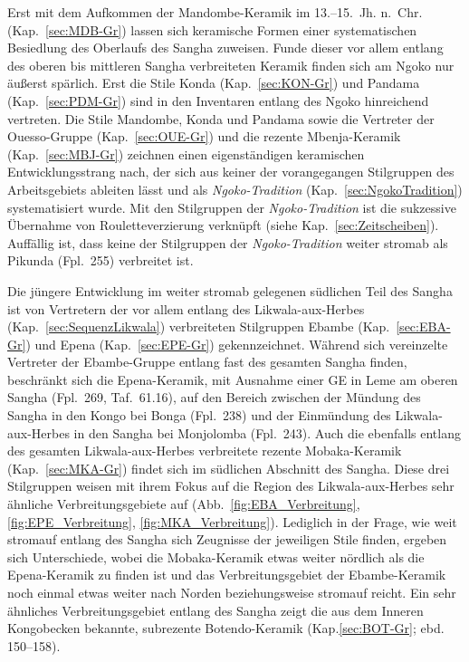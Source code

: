 Erst mit dem Aufkommen der Mandombe-Keramik im 13.--15.~Jh. n.~Chr. (Kap.~\ref{sec:MDB-Gr}) lassen sich keramische Formen einer systematischen Besiedlung des Oberlaufs des \mbox{Sangha} zuweisen. Funde dieser vor allem entlang des oberen bis mittleren \mbox{Sangha} verbreiteten Keramik finden sich am \mbox{Ngoko} nur äußerst spärlich. Erst die Stile Konda (Kap.~\ref{sec:KON-Gr}) und Pandama (Kap.~\ref{sec:PDM-Gr}) sind in den Inventaren entlang des \mbox{Ngoko} hinreichend vertreten. Die Stile Mandombe, Konda und Pandama sowie die Vertreter der Ouesso-Gruppe (Kap.~\ref{sec:OUE-Gr}) und die rezente Mbenja-Keramik (Kap.~\ref{sec:MBJ-Gr}) zeichnen einen eigenständigen keramischen Entwicklungsstrang nach, der sich aus keiner der vorangegangen Stilgruppen des Arbeitsgebiets ableiten lässt und als \textit{\mbox{Ngoko}-Tradition} (Kap.~\ref{sec:NgokoTradition}) systematisiert wurde. Mit den Stilgruppen der \textit{\mbox{Ngoko}-Tradition} ist die sukzessive Übernahme von Rouletteverzierung verknüpft (siehe Kap.~\ref{sec:Zeitscheiben}). Auffällig ist, dass keine der Stilgruppen der \textit{\mbox{Ngoko}-Tradition} weiter stromab als Pikunda (Fpl.~255) verbreitet ist.

Die jüngere Entwicklung im weiter stromab gelegenen südlichen Teil des \mbox{Sangha} ist von Vertretern der vor allem entlang des Likwala-aux-Herbes (Kap.~\ref{sec:SequenzLikwala}) verbreiteten Stilgruppen Ebambe (Kap.~\ref{sec:EBA-Gr}) und Epena (Kap.~\ref{sec:EPE-Gr}) gekennzeichnet. Während sich vereinzelte Vertreter der Ebambe-Gruppe entlang fast des gesamten \mbox{Sangha} finden, beschränkt sich die Epena-Keramik, mit Ausnahme einer GE in Leme am oberen \mbox{Sangha} (Fpl.~269, Taf.~61.16), auf den Bereich zwischen der Mündung des \mbox{Sangha} in den Kongo bei Bonga (Fpl.~238) und der Einmündung des \mbox{Likwala}-\mbox{aux}-\mbox{Herbes} in den \mbox{Sangha} bei Monjolomba (Fpl.~243). Auch die ebenfalls entlang des gesamten \mbox{Likwala}-\mbox{aux}-\mbox{Herbes} verbreitete rezente Mobaka-Keramik (Kap.~\ref{sec:MKA-Gr}) findet sich im südlichen Abschnitt des \mbox{Sangha}. Diese drei Stilgruppen weisen mit ihrem Fokus auf die Region des Likwala-aux-Herbes sehr ähnliche Verbreitungsgebiete auf (Abb.~\ref{fig:EBA_Verbreitung}, \ref{fig:EPE_Verbreitung}, \ref{fig:MKA_Verbreitung}). Lediglich in der Frage, wie weit stromauf entlang des \mbox{Sangha} sich Zeugnisse der jeweiligen Stile finden, ergeben sich Unterschiede, wobei die Mobaka-Keramik etwas weiter nördlich als die Epena-Keramik zu finden ist und das Verbreitungsgebiet der Ebambe-Keramik noch einmal etwas weiter nach Norden beziehungsweise stromauf reicht. Ein sehr ähnliches Verbreitungsgebiet entlang des \mbox{Sangha} zeigt die aus dem Inneren Kongobecken bekannte, subrezente Botendo-Keramik (Kap.\ref{sec:BOT-Gr}; ebd. 150--158).


